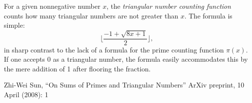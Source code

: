 \documentclass[12pt]{article}
\begin{document}
For a given nonnegative number $x$, the {\em triangular number counting function} counts how many triangular numbers are not greater than $x$. The formula is simple: $$\lfloor \frac{-1 + \sqrt{8x + 1}}{2} \rfloor ,$$ in sharp contrast to the lack of a formula for the prime counting function $\pi(x)$. If one accepts 0 as a triangular number, the formula easily accommodates this by the mere addition of 1 after flooring the fraction.

\begin{thebibliography}{1}
 Zhi-Wei Sun, ``On Sums of Primes and Triangular Numbers'' ArXiv preprint, 10 April (2008): 1
\end{thebibliography}
\end{document}
